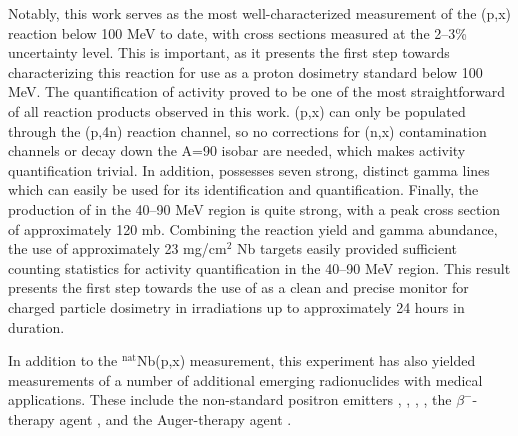 \documentclass[%
 reprint,
superscriptaddress,
onecolumn,
linenumbers,
notitlepage,
 amsmath,amssymb,
 aps,
prc,
]{revtex4-1}
\begin{document}
Notably, this work serves as the most well-characterized measurement of the (p,x) reaction below 100 MeV to date, with cross sections measured  at the 2--3\% uncertainty level.
This is important, as it presents the first step towards characterizing this reaction for use as a proton dosimetry standard below 100 MeV.
The quantification of  activity proved to be one of the most straightforward of all reaction products observed in this work.
(p,x) can only be populated through the (p,4n) reaction channel, so no corrections for (n,x) contamination channels or decay down the A=90 isobar are needed, which makes activity quantification trivial.
In addition,   possesses seven strong, distinct gamma lines which can easily  be used for its identification and quantification.
Finally, the production of   in the 40--90 MeV region is quite strong, with a peak cross section of approximately 120 mb.
Combining the reaction yield and gamma abundance, the use of approximately 23 mg/cm$^2$ Nb targets easily provided sufficient counting statistics for activity quantification in the 40--90 MeV region.
This result presents the first step towards the use of  as a clean and precise monitor for charged particle dosimetry in irradiations up to approximately 24 hours in duration.





In addition to the $^\text{nat}$Nb(p,x) measurement, this experiment has also yielded measurements of  a number of additional  emerging radionuclides with medical applications.
These include the non-standard positron emitters ,  , ,  , the $\beta^-$-therapy agent  ,  and the Auger-therapy agent . 
\end{document}
